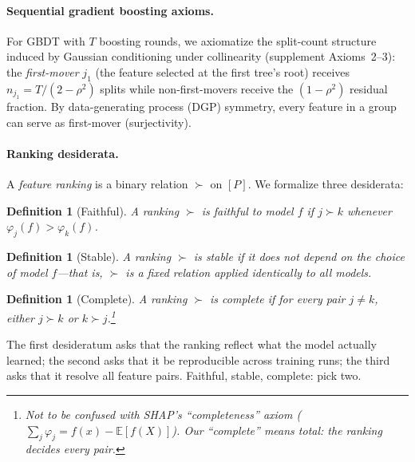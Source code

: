 \documentclass{article}
\newtheorem{definition}[theorem]{Definition}
\newcommand{\E}{\mathbb{E}}
\newcommand{\DASH}{\textsc{Dash}}
\newcommand{\GBDT}{\textsc{GBDT}}
\begin{document}
\paragraph{Sequential gradient boosting axioms.}
For \GBDT{} with $T$ boosting rounds, we axiomatize the split-count structure induced by Gaussian conditioning under collinearity (supplement Axioms~2--3): the \emph{first-mover} $j_1$ (the feature selected at the first tree's root) receives $n_{j_1} = T/(2{-}\rho^2)$ splits while non-first-movers receive the $(1{-}\rho^2)$ residual fraction. By data-generating process (DGP) symmetry, every feature in a group can serve as first-mover (surjectivity).

\paragraph{Ranking desiderata.}
A \emph{feature ranking} is a binary relation $\succ$ on $[P]$.
We formalize three desiderata:

\begin{definition}[Faithful]
\label{def:faithful}
A ranking $\succ$ is \emph{faithful} to model $f$ if $j \succ k$ whenever $\varphi_j(f) > \varphi_k(f)$.
\end{definition}

\begin{definition}[Stable]
\label{def:stable}
A ranking $\succ$ is \emph{stable} if it does not depend on the choice of model $f$---that is, $\succ$ is a fixed relation applied identically to all models.
\end{definition}

\begin{definition}[Complete]
\label{def:complete}
A ranking $\succ$ is \emph{complete} if for every pair $j \neq k$, either $j \succ k$ or $k \succ j$.\footnote{Not to be confused with SHAP's ``completeness'' axiom ($\sum_j \varphi_j = f(x) - \E[f(X)]$). Our ``complete'' means \emph{total}: the ranking decides every pair.}
\end{definition}

The first desideratum asks that the ranking reflect what the model actually learned; the second asks that it be reproducible across training runs; the third asks that it resolve all feature pairs.
Faithful, stable, complete: pick two.

\end{document}
